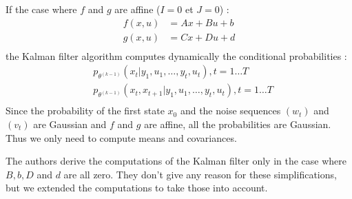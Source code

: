 If the case where $f$ and $g$ are affine ($I=0$ et $J=0$) :
\begin{align*}
  f(x,u) &= Ax + Bu + b\\
  g(x,u) &= Cx + Du + d\\
\end{align*}
the Kalman filter algorithm computes dynamically the conditional probabilities :
\begin{align*}
  &p_{\theta^{(k-1)}}\left(x_t|y_1, u_1, \ldots, y_t, u_t \right ), t=1 \ldots T\\
  &p_{\theta^{(k-1)}}\left(x_t, x_{t+1}|y_1, u_1, \ldots, y_t, u_t \right ), t=1 \ldots T\\
\end{align*}
Since the probability of the first state $x_0$ and the noise sequences $(w_t)$ and $(v_t)$ are Gaussian and $f$ and $g$ are affine, all the probabilities are Gaussian.
Thus we only need to compute means and covariances.

The authors derive the computations of the Kalman filter only in the case where $B,b,D$ and $d$ are all zero.
They don't give any reason for these simplifications, but we extended the computations to take those into account.

